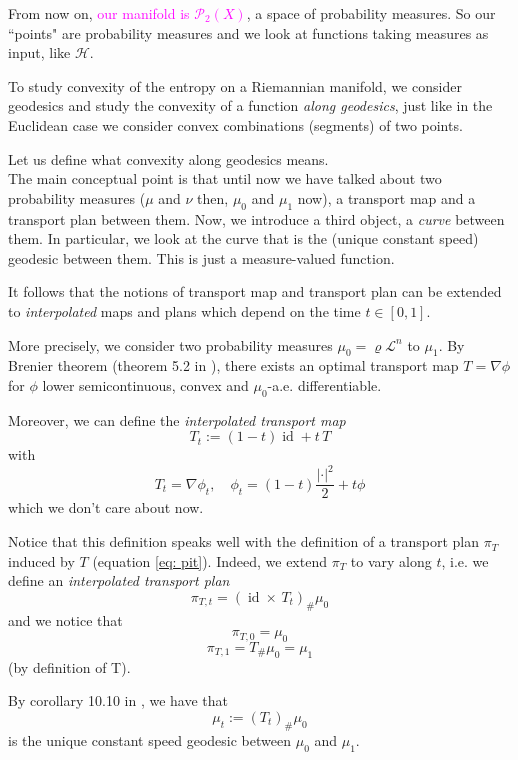 \documentclass[a4paper,12pt,reqno]{amsbook}
\theoremstyle{definition} %
\newcommand{\1}{\mathbbm{1}}
\newcommand{\mL}{\mathscr{L}}
\newcommand{\mP}{\mathscr{P}}
\newcommand{\cH}{\mathcal{H}} %
\DeclareMathOperator*{\id}{id}
\theoremstyle{plain}
\theoremstyle{remark}
\begin{document}
{\begin{remark}
    From now on, \textcolor{magenta}{our manifold is $\mP_2(X)$}, a space of probability measures.
    So our ``points" are probability measures and we look at functions taking measures as input, like $\cH$. 
\end{remark}

To study convexity of the entropy on a Riemannian manifold, we consider geodesics and study the convexity of a function \textit{along geodesics}, just like in the Euclidean case we consider convex combinations (segments) of two points. 

Let us define what convexity along geodesics means. 
\\

The main conceptual point is that until now we have talked about two probability measures ($\mu$ and $\nu$ then, $\mu_0$ and $\mu_1$ now), a transport map and a transport plan between them. Now, we introduce a third object, a \emph{curve} between them. In particular, we look at the curve that is the (unique constant speed) geodesic between them. This is just a measure-valued function.

It follows that the notions of transport map and transport plan can be extended to \emph{interpolated} maps and plans which depend on the time $t \in [0,1]$. 

More precisely, we consider two probability measures $\mu_0= \varrho \mL^n$ to $\mu_1$. By Brenier theorem (theorem 5.2 in \cite{brue}), there exists an optimal transport map $T=\nabla \phi$ for $\phi$ lower semicontinuous, convex and $\mu_0$-a.e. differentiable. 

Moreover, we can define  the \emph{interpolated transport map}
\begin{equation}\label{eq: Tt}
    T_t:= (1-t) \id + t\,T
\end{equation}
with
\[
T_t= \nabla \phi_t, \quad \phi_t= (1-t) \frac{|\cdot|^2}{2} + t\phi
\]
which we don't care about now. 

Notice that this definition speaks well with the definition of a transport plan $\pi_T$ induced by $T$ (equation \ref{eq: pit}).
Indeed, we extend $\pi_T$ to vary along $t$, i.e. we define an \emph{interpolated transport plan}
\[
\pi_{T,t} = (\id \times \,T_t)_\# \mu_0
\]
and we notice that \[
\pi_{T,0} = \mu_0
\]\[\pi_{T,1}=T_\#\mu_0=\mu_1\]
(by definition of T). 

By corollary 10.10 in \cite{brue}, we have that 
\[
\mu_t := (T_t)_\#\mu_0
\]
is the unique constant speed geodesic between $\mu_0$ and $\mu_1$.

}
\end{document}
